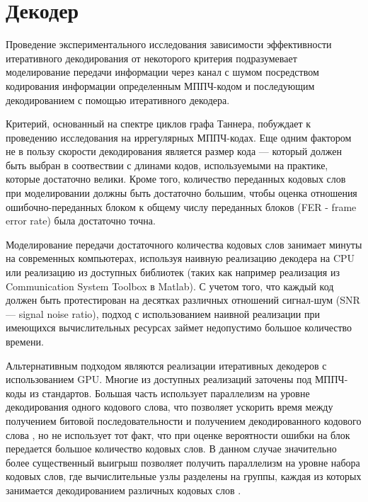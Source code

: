 \chapter{Декодер}

Проведение экспериментального исследования зависимости эффективности итеративного декодирования от некоторого
критерия подразумевает моделирование передачи информации через канал с шумом посредством 
кодирования информации определенным МППЧ-кодом и последующим декодированием с помощью итеративного декодера.

Критерий, основанный на спектре циклов графа Таннера, побуждает к проведению исследования на иррегулярных
МППЧ-кодах. Еще одним фактором не в пользу скорости декодирования является размер кода --- который
должен быть выбран в соотвествии с длинами кодов, используемыми на практике, которые достаточно велики.
Кроме того, количество переданных кодовых слов при моделировании должны быть достаточно большим, чтобы оценка
отношения ошибочно-переданных блоком к общему числу переданных блоков (FER - frame error rate) была достаточно точна.

Моделирование передачи достаточного количества кодовых слов занимает минуты на современных 
компьютерах, используя наивную реализацию декодера на CPU или реализацию из доступных библиотек 
(таких как например реализация из Communication System Toolbox в Matlab). 
С учетом того, что каждый код должен быть протестирован на десятках различных отношений сигнал-шум (SNR ---
signal noise ratio), подход с использованием наивной реализации при имеющихся вычислительных ресурсах займет
недопустимо большое количество времени. 

Альтернативным подходом являются реализации итеративных декодеров с использованием
GPU.
Многие из доступных реализаций заточены под МППЧ-коды из стандартов. Большая часть использует параллелизм
на уровне декодирования одного кодового слова, что позволяет ускорить время между получением 
битовой последовательности и получением декодированного кодового слова
\cite{stressing-the-ber-simulation-of-ldpc-codes-in-the-error-floor-region-using-gpu-clusters}, 
но не использует тот факт, что при оценке вероятности ошибки на блок передается большое количество кодовых
слов. В данном случае значительно более существенный выигрыш позволяет получить параллелизм
на уровне набора кодовых слов, где вычислительные узлы разделены на группы, каждая из которых занимается
декодированием различных кодовых слов
\cite{opencl-cuda-algorithms-for-parallel-decoding-of-any-irregular-ldpc-code-using-gpu}.

